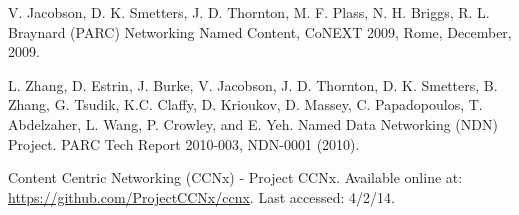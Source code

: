\documentclass[10pt]{article}
\begin{document}

\begin{thebibliography}{[MT1]}

 V. Jacobson, D. K. Smetters, J. D. Thornton, M. F. Plass, N. H. Briggs, R. L. Braynard (PARC) Networking Named Content, CoNEXT 2009, Rome, December, 2009.

 L. Zhang, D. Estrin, J. Burke, V. Jacobson, J. D. Thornton, D. K. Smetters, B. Zhang, G. Tsudik, K.C. Claffy, D. Krioukov, D. Massey, C. Papadopoulos, T. Abdelzaher, L. Wang, P. Crowley, and E. Yeh. Named Data Networking (NDN) Project. PARC Tech Report 2010-003, NDN-0001 (2010).

 Content Centric Networking (CCNx) - Project CCNx. Available online at: \url{https://github.com/ProjectCCNx/ccnx}. Last accessed: 4/2/14.

\end{thebibliography}
\end{document}
